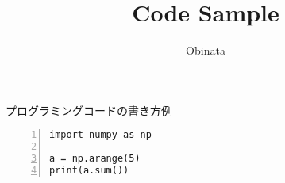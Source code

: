 \documentclass[10pt]{jsarticle}
\begin{document}
	\title{Code Sample}
	\author{Obinata}
	\date{}	
	\maketitle
	

	プログラミングコードの書き方例
	\begin{lstlisting}[basicstyle=\ttfamily, frame=single,numbers=left]
import numpy as np

a = np.arange(5)
print(a.sum())
	\end{lstlisting}
	
\end{document}

